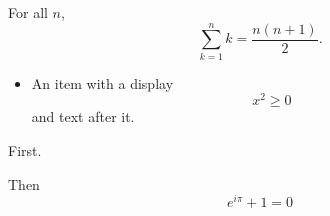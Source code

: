 \documentclass{beamer}
\begin{document}
\begin{frame}
\begin{theorem}
For all $n$,
\begin{equation}
\sum_{k=1}^n k = \frac{n(n+1)}{2}.
\end{equation}
\end{theorem}
\begin{itemize}
\item An item with a display
\[ x^2 \geq 0 \]
and text after it.
\end{itemize}
\end{frame}
\begin{frame}
First.

\pause

Then
\begin{equation}
e^{i\pi} + 1 = 0
\end{equation}
\end{frame}
\end{document}
